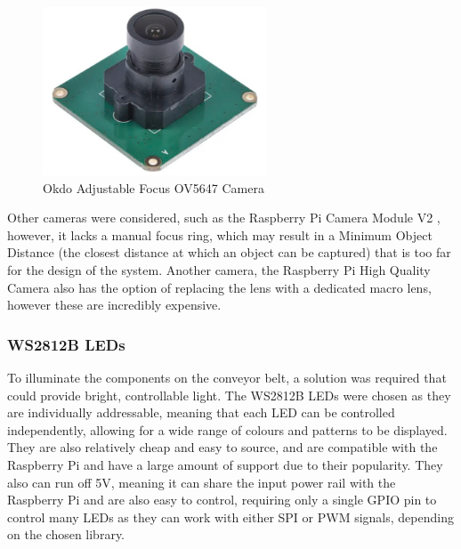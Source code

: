 \begin{figure}[H]
    \begin{minipage}[t]{\textwidth}
      \centering
      \includegraphics[width=\textwidth,height=5cm, keepaspectratio]{imgs/parts/okdo_camera.jpg}
      \caption{Okdo Adjustable Focus OV5647 Camera \cite{okdocamera}}
    \end{minipage}
\end{figure}

Other cameras were considered, such as the Raspberry Pi Camera Module V2 \cite{picamerav2}, however, it lacks a manual focus ring, which may result in a Minimum Object Distance (the closest distance at which an object can be captured) that is too far for the design of the system. Another camera, the Raspberry Pi High Quality Camera \cite{picamerahq} also has the option of replacing the lens with a dedicated macro lens, however these are incredibly expensive.

\subsubsection{WS2812B LEDs}
To illuminate the components on the conveyor belt, a solution was required that could provide bright, controllable light. The WS2812B LEDs \cite{ws2812b} were chosen as they are individually addressable, meaning that each LED can be controlled independently, allowing for a wide range of colours and patterns to be displayed. They are also relatively cheap and easy to source, and are compatible with the Raspberry Pi and have a large amount of support due to their popularity. They also can run off 5V, meaning it can share the input power rail with the Raspberry Pi and are also easy to control, requiring only a single GPIO pin to control many LEDs as they can work with either SPI or PWM signals, depending on the chosen library.

